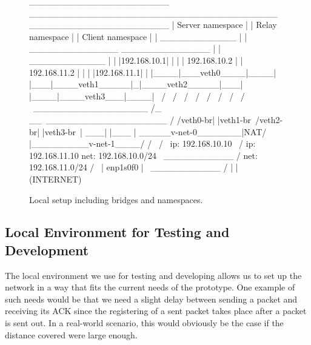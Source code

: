 \vspace{0.5cm}
\begin{figure}[H]
\centering
\begin{myverbatim}
 ______________________         _______________________________________        ______________________
|   Server namespace   |       |            Relay namespace            |      |   Client namespace   |
|     ____________     |       |    ______________   ______________    |      |     ____________     |
|    |192.168.10.1|    |       |   | 192.168.10.2 | | 192.168.11.2 |   |      |    |192.168.11.1|    |
|____|___veth0____|____|       |___|____veth1_____|_|____veth2_____|___|      |____|____veth3___|____|
            \                            /                 \                             /
             \                          /                   \                           /
              \                        /                     \                         /
               \                      /                       \                       /
                \ __________________ /_                      __\ ___________________ /
                /veth0-br|     |veth1-br\                   /veth2-br|      |veth3-br\
                |                    ___|                   |___                     |
                \_____v-net-0_______|NAT/                   \NAT|_________v-net-1____/
                        /              \                     /                \
               ip: 192.168.10.10        \                   /         ip: 192.168.11.10
               net: 192.168.10.0/24      \   ___________   /          net: 192.168.11.0/24
                                           /             \
                                          |   enp1s0f0    |
                                           \ ___________ /
                                                  |
                                                  |
                                              (INTERNET)

\end{myverbatim}
\caption{Local setup including bridges and namespaces.}\label{fig:namespace-setup}
\end{figure}
\vspace{0.5cm}

\subsection{Local Environment for Testing and Development}\label{subsec:namespace_environment}
The local environment we use for testing and developing allows us to set up the network in a way 
that fits the current needs of the prototype.
One example of such needs would be that we need a slight delay between sending a packet and 
receiving its ACK since the registering of a sent packet takes place after a packet 
is sent out. 
In a real-world scenario, this would obviously be the case if the distance covered 
were large enough.

